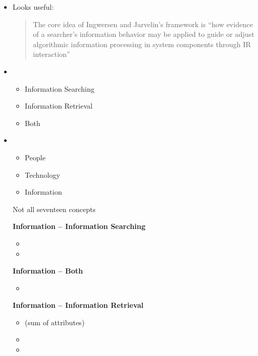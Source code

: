\documentclass{article}
\begin{document}

\begin{itemize}

\item Looks useful:
    \begin{quote}
    The core idea of Ingwersen and Jarvelin's framework is ``how evidence of a searcher's information behavior may be applied to guide or adjust algorithmic information processing in system components through IR interaction''
    \end{quote}

\item {}
    \begin{itemize}
        \item Information Searching \\
        \item Information Retrieval \\
        \item Both
    \end{itemize}

\item {}
    \begin{itemize}
        \item People
        \item Technology
        \item Information
    \end{itemize}

    Not all seventeen concepts

    {\bf Information -- Information Searching}
    \begin{itemize}
        \item {} 
        \item {}
    \end{itemize}

    {\bf Information -- Both}
    \begin{itemize}
        \item {}
    \end{itemize}

    {\bf Information -- Information Retrieval}
    \begin{itemize}
        \item {} (sum of attributes)
        \item {}
        \item {}
    \end{itemize}


\end{itemize}
\end{document}
